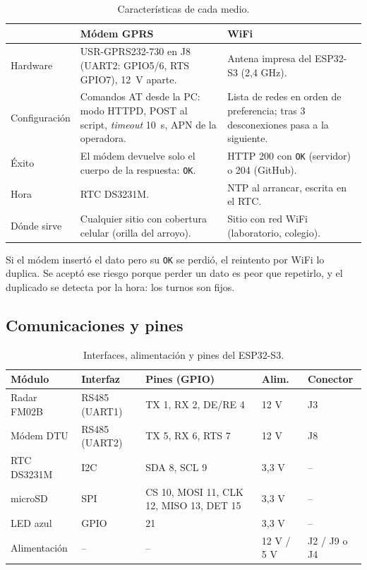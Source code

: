 \documentclass[11pt,a4paper]{article}
\begin{document}
\begin{table}[H]
    \centering
    \small
    \caption{Características de cada medio.}
    \begin{tabularx}{\textwidth}{>{\raggedright\arraybackslash}p{2.6cm}LL}
        \toprule
        & Módem GPRS & WiFi \\
        \midrule
        Hardware & USR-GPRS232-730 en J8 (UART2: GPIO5/6, RTS GPIO7), 12~V
            aparte. & Antena impresa del ESP32-S3 (2,4 GHz). \\
        Configuración & Comandos AT desde la PC: modo HTTPD, POST al script,
            \emph{timeout} 10~s, APN de la operadora. & Lista de redes en
            orden de preferencia; tras 3 desconexiones pasa a la siguiente. \\
        Éxito & El módem devuelve solo el cuerpo de la respuesta:
            \texttt{OK}. & HTTP 200 con \texttt{OK} (servidor) o 204
            (GitHub). \\
        Hora & RTC DS3231M. & NTP al arrancar, escrita en el RTC. \\
        Dónde sirve & Cualquier sitio con cobertura celular (orilla del
            arroyo). & Sitio con red WiFi (laboratorio, colegio). \\
        \bottomrule
    \end{tabularx}
\end{table}

Si el módem insertó el dato pero su \texttt{OK} se perdió, el reintento por
WiFi lo duplica. Se aceptó ese riesgo porque perder un dato es peor que
repetirlo, y el duplicado se detecta por la hora: los turnos son fijos.

\subsection{Comunicaciones y pines}

\begin{table}[H]
    \centering
    \small
    \caption{Interfaces, alimentación y pines del ESP32-S3.}
    \footnotesize\setlength{\tabcolsep}{4pt}
    \begin{tabular}{lllll}
        \toprule
        \textbf{Módulo} & \textbf{Interfaz} & \textbf{Pines (GPIO)} & \textbf{Alim.} & \textbf{Conector} \\
        \midrule
        Radar FM02B      & RS485 (UART1) & TX 1, RX 2, DE/RE 4 & 12 V & J3 \\
        Módem DTU        & RS485 (UART2) & TX 5, RX 6, RTS 7 & 12 V & J8 \\
        RTC DS3231M      & I2C & SDA 8, SCL 9 & 3,3 V & -- \\
        microSD          & SPI & CS 10, MOSI 11, CLK 12, MISO 13, DET 15 & 3,3 V & -- \\
        LED azul         & GPIO & 21 & 3,3 V & -- \\
        Alimentación     & -- & -- & 12 V / 5 V & J2 / J9 o J4 \\
        \bottomrule
    \end{tabular}
\end{table}
\end{document}
